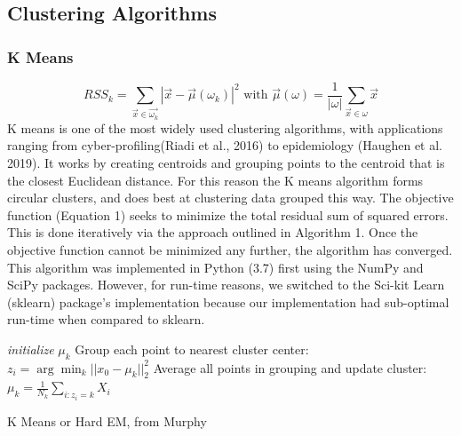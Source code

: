 \documentclass{article}
\begin{document}
\subsection{Clustering Algorithms}
\subsubsection{K Means}
\begin{equation}
    RSS_k = \sum_{\vec{x} \in \vec{\omega_k}}|\vec{x} - \vec{\mu}(\omega_k)|^2 \text {   with   } \vec{\mu}(\omega)= \frac{1}{|\omega|} \sum_{\vec{x}\in \omega}\vec{x}
\end{equation}
K means is one of the most widely used clustering algorithms, with applications ranging from cyber-profiling(Riadi et al., 2016)  to epidemiology (Haughen et al. 2019). It works by creating centroids and grouping points to the centroid that is  the closest Euclidean distance. For this reason the K means algorithm forms circular clusters, and does best at clustering data grouped this way. The objective function (Equation 1) seeks to minimize the total residual sum of squared errors. This is done iteratively via the approach outlined in Algorithm 1. Once the objective function cannot be minimized any further, the algorithm has converged. This algorithm was implemented in Python (3.7) first using the NumPy and SciPy packages. However, for run-time reasons, we switched to the Sci-kit Learn (sklearn)  package’s implementation because our implementation had sub-optimal run-time when compared to sklearn. 
\begin{center}
\begin{algorithm}
 \textit{initialize} $\mu_k$ \;
   {Group each point to nearest cluster center: $z_i = \arg \min_k ||x_0 - \mu_k||^2_2 $\;
   Average all points in grouping and update cluster: $\mu_k = \frac{1}{N_k}\sum_{i:z_i = k} X_i$}
  
  \caption{K Means or Hard EM, from Murphy}
\end{algorithm}
\end{center}
\end{document}
